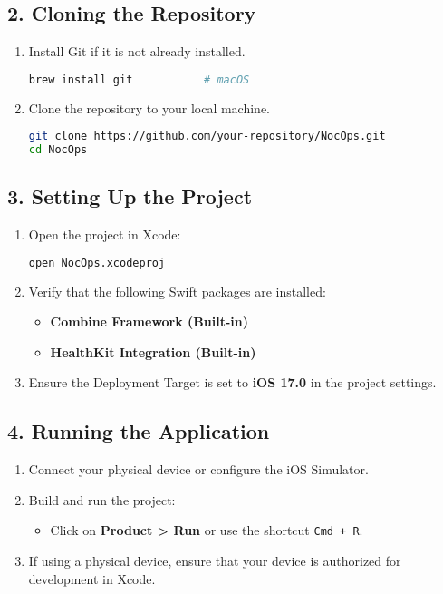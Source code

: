\documentclass[10pt,twocolumn]{article}
\begin{document}
\subsection*{2. Cloning the Repository}
\begin{enumerate}
    \item Install Git if it is not already installed.
    \begin{lstlisting}[language=bash]
brew install git           # macOS
    \end{lstlisting}
    \item Clone the repository to your local machine.
    \begin{lstlisting}[language=bash]
git clone https://github.com/your-repository/NocOps.git
cd NocOps
    \end{lstlisting}
\end{enumerate}

\subsection*{3. Setting Up the Project}
\begin{enumerate}
    \item Open the project in Xcode:
    \begin{lstlisting}[language=bash]
open NocOps.xcodeproj
    \end{lstlisting}
    \item Verify that the following Swift packages are installed:
    \begin{itemize}
        \item \textbf{Combine Framework (Built-in)}
        \item \textbf{HealthKit Integration (Built-in)}
    \end{itemize}
    \item Ensure the Deployment Target is set to \textbf{iOS 17.0} in the project settings.
\end{enumerate}

\subsection*{4. Running the Application}
\begin{enumerate}
    \item Connect your physical device or configure the iOS Simulator.
    \item Build and run the project:
    \begin{itemize}
        \item Click on \textbf{Product > Run} or use the shortcut \texttt{Cmd + R}.
    \end{itemize}
    \item If using a physical device, ensure that your device is authorized for development in Xcode.
\end{enumerate}
\end{document}
